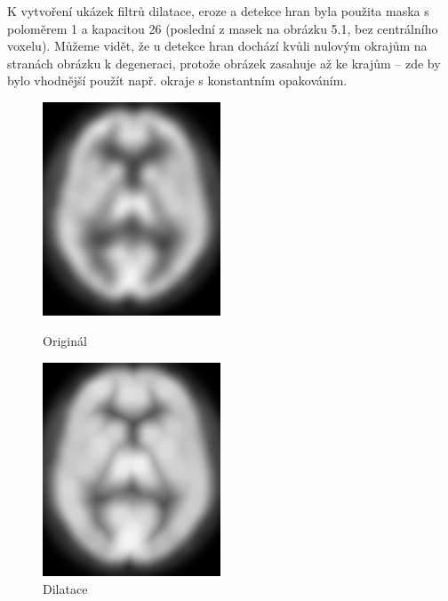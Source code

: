      K vytvoření ukázek filtrů dilatace, eroze a detekce hran byla použita maska s poloměrem 1 a kapacitou 26 (poslední z masek na obrázku 5.1, bez centrálního voxelu). Můžeme vidět, že u detekce hran dochází kvůli nulovým okrajům na stranách obrázku k degeneraci, protože obrázek zasahuje až ke krajům -- zde by bylo vhodnější použít např. okraje s konstantním opakováním.
    \vfill
    \begin{figure}[htp]
        \begin{minipage}[l]{0.5\textwidth}
            \center
            \includegraphics[width = 150pt]{src/8Appendix/final/original.png}
            \caption{Originál}
        \end{minipage}
        \begin{minipage}[r]{0.5\textwidth}
            \center
            \includegraphics[width = 150pt]{src/8Appendix/final/dilatace.png}
            \caption{Dilatace}
        \end{minipage}
     \end{figure}
